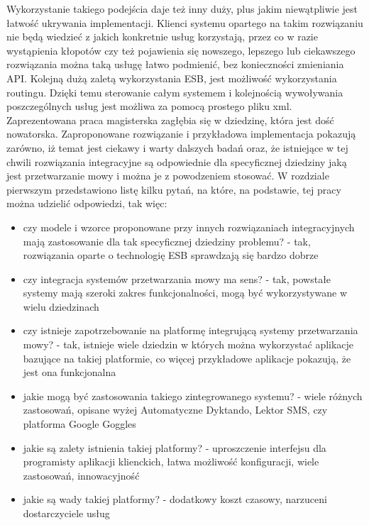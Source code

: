 Wykorzystanie takiego podejścia daje też inny duży, plus jakim niewątpliwie jest łatwość ukrywania implementacji. Klienci systemu opartego na takim rozwiązaniu nie będą wiedzieć z jakich konkretnie usług korzystają, przez co w razie wystąpienia kłopotów czy też pojawienia się nowszego, lepszego lub ciekawszego rozwiązania można taką usługę łatwo podmienić, bez konieczności zmieniania API. Kolejną dużą zaletą wykorzystania ESB, jest możliwość wykorzystania routingu. Dzięki temu sterowanie całym systemem i kolejnością wywoływania poszczególnych usług jest możliwa za pomocą prostego pliku xml.  \\
Zaprezentowana praca magisterska zagłębia się w dziedzinę, która jest dość nowatorska. Zaproponowane rozwiązanie i przykładowa implementacja pokazują zarówno, iż temat jest ciekawy i warty dalszych badań oraz, że istniejące w tej chwili rozwiązania integracyjne są odpowiednie dla specyficznej dziedziny jaką jest przetwarzanie mowy i można je z powodzeniem stosować. W rozdziale pierwszym przedstawiono listę kilku pytań, na które, na podstawie, tej pracy można udzielić odpowiedzi, tak więc:
\begin{itemize}
	\item czy modele i wzorce proponowane przy innych rozwiązaniach integracyjnych mają zastosowanie dla tak specyficznej dziedziny problemu? - tak, rozwiązania oparte o technologię ESB sprawdzają się bardzo dobrze
	\item czy integracja systemów przetwarzania mowy ma sens? - tak, powstałe systemy mają szeroki zakres funkcjonalności, mogą być wykorzystywane w wielu dziedzinach
	\item czy istnieje zapotrzebowanie na platformę integrującą systemy przetwarzania mowy? - tak, istnieje wiele dziedzin w których można wykorzystać aplikacje bazujące na takiej platformie, co więcej przykładowe aplikacje pokazują, że jest ona funkcjonalna
	\item jakie mogą być zastosowania takiego zintegrowanego systemu? - wiele różnych zastosowań, opisane wyżej Automatyczne Dyktando, Lektor SMS, czy platforma Google Goggles 
	\item jakie są zalety istnienia takiej platformy? - uproszczenie interfejsu dla programisty aplikacji klienckich, łatwa możliwość konfiguracji, wiele zastosowań, innowacyjność
	\item jakie są wady takiej platformy? - dodatkowy koszt czasowy, narzuceni dostarczyciele usług
\end{itemize}







